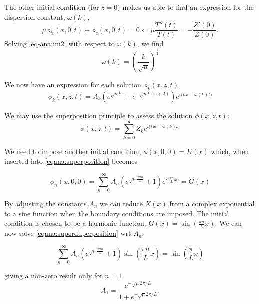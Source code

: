 \documentclass[11pt]{article}
\begin{document}
The other initial condition (for $z=0$) makes us able to find an expression for the dispersion constant, $\omega(k)$,
\begin{equation}
\mu \phi_{tt}(x,0,t) + \phi_{z}(x,0,t) = 0 \Longleftarrow \mu \frac{T''(t)}{T(t)} = - \frac{Z'(0)}{Z(0)}.
\label{eq-ana:ini2}
\end{equation}
Solving \eqref{eq-ana:ini2} with respect to $\omega(k)$, we find
\begin{equation*}
\omega(k) = \left( \frac{k}{\sqrt{\mu}} \right)^{\frac{1}{2}}
\end{equation*}

We now have an expression for each solution $\phi_k(x,z,t)$,
\begin{equation*}
\phi_k(x,z,t) = A_k \left( e^{\sqrt{\mu}kz} + e^{-\sqrt{\mu}k(z+2)} \right) e^{i\big( kx - \omega(k)t \big)}
\end{equation*}

We may use the superposition principle to assess the solution $\phi(x,z,t)$:
\begin{equation}
\label{eqana:superposition}
\phi(x,z,t) = \sum_{k=0}^{\infty} Z_k e^{i\big(kx - \omega(k) t \big)}
\end{equation}

We need to impose another initial condition, $\phi(x,0,0) = K(x)$ which, when inserted into \eqref{eqana:superposition} becomes

\begin{equation}
\phi_n(x,0,0) = \sum_{n=0}^{\infty} A_n \left( e^{\sqrt{\mu}\frac{2 \pi n}{L}} + 1 \right) e^{ i \big( \frac{\pi n}{L}x \big) } = G(x)
\label{eqana:superduperposition}
\end{equation}

By adjusting the constants $A_n$ we can reduce $X(x)$ from a complex exponential to a sine function when the boundary conditions are imposed. The initial condition is chosen to be a harmonic function, $G(x) = \sin \left(\frac{\pi n}{L}x \right)$. We can now solve \eqref{eqana:superduperposition} wrt $A_n$:

\begin{equation*}
\sum_{n=0}^{\infty} A_n \left( e^{\sqrt{\mu}\frac{2 \pi n}{L}} + 1 \right) \sin \left(\frac{\pi n}{L}x \right) = \sin \left( \frac{\pi }{L}x \right)
\end{equation*}

giving a non-zero result only for $n=1$
\begin{equation*}
A_1 = \frac{e^{- \sqrt{\mu}2\pi  /L } }{1 + e^{- \sqrt{\mu} 2\pi /L}}.
\end{equation*}
\end{document}
